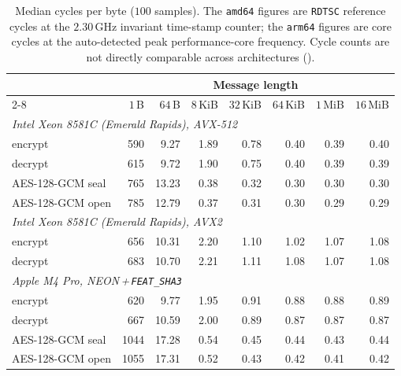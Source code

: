 \begin{table}
\centering
\caption{Median cycles per byte ($100$ samples). The \texttt{amd64} figures are
\texttt{RDTSC} reference cycles at the $2.30$\,GHz invariant time-stamp counter;
the \texttt{arm64} figures are core cycles at the auto-detected peak performance-core
frequency. Cycle counts are not directly comparable across architectures
().}
\label{tab:cpb}
\begin{tabular}{l rrrrrrr}
\toprule
& \multicolumn{7}{c}{Message length} \\
\cmidrule(l){2-8}
& $1$\,B & $64$\,B & $8$\,KiB & $32$\,KiB & $64$\,KiB & $1$\,MiB & $16$\,MiB \\
\midrule
\multicolumn{8}{l}{\emph{Intel Xeon 8581C (Emerald Rapids), AVX-512}} \\
\quad \TW{} encrypt      & 590 & 9.27 & 1.89 & 0.78 & 0.40 & 0.39 & 0.40 \\
\quad \TW{} decrypt      & 615 & 9.72 & 1.90 & 0.75 & 0.40 & 0.39 & 0.39 \\
\quad AES-128-GCM seal   & 765 & 13.23 & 0.38 & 0.32 & 0.30 & 0.30 & 0.30 \\
\quad AES-128-GCM open   & 785 & 12.79 & 0.37 & 0.31 & 0.30 & 0.29 & 0.29 \\
\midrule
\multicolumn{8}{l}{\emph{Intel Xeon 8581C (Emerald Rapids), AVX2}} \\
\quad \TW{} encrypt      & 656 & 10.31 & 2.20 & 1.10 & 1.02 & 1.07 & 1.08 \\
\quad \TW{} decrypt      & 683 & 10.70 & 2.21 & 1.11 & 1.08 & 1.07 & 1.08 \\
\midrule
\multicolumn{8}{l}{\emph{Apple M4 Pro, NEON\,+\,\texttt{FEAT\_SHA3}}} \\
\quad \TW{} encrypt      & 620 & 9.77 & 1.95 & 0.91 & 0.88 & 0.88 & 0.89 \\
\quad \TW{} decrypt      & 667 & 10.59 & 2.00 & 0.89 & 0.87 & 0.87 & 0.87 \\
\quad AES-128-GCM seal   & 1044 & 17.28 & 0.54 & 0.45 & 0.44 & 0.43 & 0.44 \\
\quad AES-128-GCM open   & 1055 & 17.31 & 0.52 & 0.43 & 0.42 & 0.41 & 0.42 \\
\bottomrule
\end{tabular}
\end{table}

